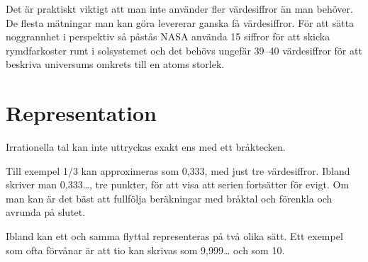Det är praktiskt viktigt att man inte använder fler värdesiffror än
man behöver.  De flesta mätningar man kan göra levererar ganska få
värdesiffror.  För att sätta noggrannhet i perspektiv så påstås NASA
använda 15 siffror för att skicka rymdfarkoster runt i solsystemet och
det behövs ungefär 39--40 värdesiffror för att beskriva universums
omkrets till en atoms storlek.

\section{Representation}

Irrationella tal kan inte uttryckas exakt ens med ett bråktecken.

Till exempel 1/3 kan approximeras som 0,333, med just tre
värdesiffror.  Ibland skriver man 0,333…, tre punkter, för att visa
att serien fortsätter för evigt. Om man kan är det bäst att fullfölja
beräkningar med bråktal och förenkla och avrunda på slutet.

Ibland kan ett och samma flyttal representeras på två olika sätt. Ett
exempel som ofta förvånar är att tio kan skrivas som 9,999… och som
10.







